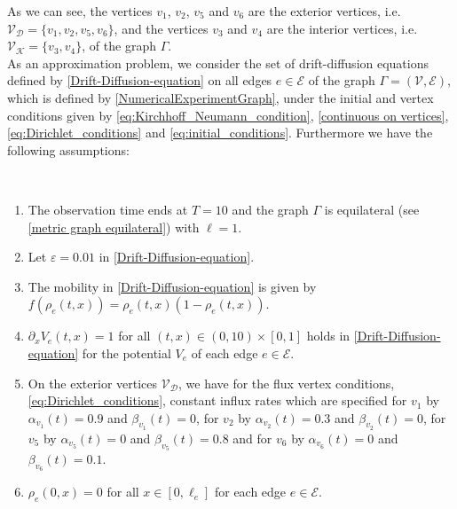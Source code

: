 As we can see, the vertices $v_1$, $v_2$, $v_5$ and $v_6$ are the exterior vertices, i.e. $\mathcal{V}_{\mathcal{D}} = \{v_1, v_2, v_5, v_6\}$, and the vertices $v_3$ and $v_4$ are the interior vertices, i.e. $\mathcal{V}_{\mathcal{K}} = \{v_3, v_4\}$, of the graph $\Gamma$. \\
As an approximation problem, we consider the set of drift-diffusion equations defined by \cref{Drift-Diffusion-equation} on all edges $e \in \mathcal{E}$ of the graph $\Gamma = (\mathcal{V}, \mathcal{E})$, which is defined by \cref{NumericalExperimentGraph}, under the initial and vertex conditions given by \cref{eq:Kirchhoff_Neumann_condition}, \cref{continuous on vertices}, \cref{eq:Dirichlet_conditions} and \cref{eq:initial_conditions}. Furthermore we have the following assumptions:
\begin{assumption} \label{graph_assumptions} 
    \ \\[-1.5\baselineskip]
    \begin{enumerate}
        \item The observation time ends at $T = 10$ and the graph $\Gamma$ is equilateral (see \cref{metric graph equilateral}) with $\ell = 1$. 
        \item Let $\varepsilon = 0.01$ in \cref{Drift-Diffusion-equation}.
        \item The mobility in \cref{Drift-Diffusion-equation} is given by $f(\rho_e(t,x)) = \rho_e (t,x)(1-\rho_e (t,x))$.
        \item $\partial_x V_e (t,x) = 1$ for all $(t,x) \in (0, 10) \times [0,1]$ holds in \cref{Drift-Diffusion-equation} for the potential $V_e$ of each edge $e \in \mathcal{E}$. 
        \item On the exterior vertices $\mathcal{V}_{\mathcal{D}}$, we have for the flux vertex conditions, \cref{eq:Dirichlet_conditions}, constant influx rates which are specified for $v_1$ by $\alpha_{v_1}(t) = 0.9$ and $\beta_{v_1}(t) = 0$, for $v_2$ by $\alpha_{v_2}(t) = 0.3$ and $\beta_{v_2}(t) = 0$, for $v_5$ by $\alpha_{v_5}(t) = 0$ and $\beta_{v_5}(t) = 0.8$ and for $v_6$ by $\alpha_{v_6}(t) = 0$ and $\beta_{v_6}(t) = 0.1$.
        \item $\rho_e(0,x) = 0$ for all $x \in [0, \ell_e]$ for each edge $e \in \mathcal{E}$. 
    \end{enumerate}
\end{assumption}
